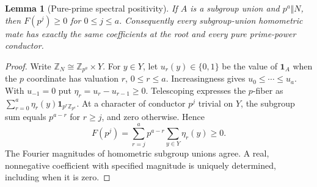 \documentclass[11pt]{article}
\numberwithin{equation}{section}
\newtheorem{lemma}[theorem]{Lemma}
\theoremstyle{definition}
\theoremstyle{remark}
\newcommand{\one}{\mathbf 1}
\begin{document}
\begin{lemma}[Pure-prime spectral positivity]\label{ii:lem:pure}
If $A$ is a subgroup union and $p^a\Vert N$, then $F(p^j)\ge0$ for $0\le j\le a$.  Consequently every subgroup-union homometric mate has exactly the same coefficients at the root and every pure prime-power conductor.
\end{lemma}
\begin{proof}
Write $\mathbb Z_N\cong\mathbb Z_{p^a}\times Y$.  For $y\in Y$, let $u_r(y)\in\{0,1\}$ be the value of $\one_A$ when the $p$ coordinate has valuation $r$, $0\le r\le a$.  Increasingness gives $u_0\le\cdots\le u_a$.  With $u_{-1}=0$ put $\eta_r=u_r-u_{r-1}\ge0$.  Telescoping expresses the $p$-fiber as $\sum_{r=0}^a\eta_r(y)\one_{p^r\mathbb Z_{p^a}}$.  At a character of conductor $p^j$ trivial on $Y$, the subgroup sum equals $p^{a-r}$ for $r\ge j$, and zero otherwise.  Hence
\[
 F(p^j)=\sum_{r=j}^a p^{a-r}\sum_{y\in Y}\eta_r(y)\ge0.
\]
The Fourier magnitudes of homometric subgroup unions agree.  A real, nonnegative coefficient with specified magnitude is uniquely determined, including when it is zero.\qedhere
\end{proof}
\end{document}
